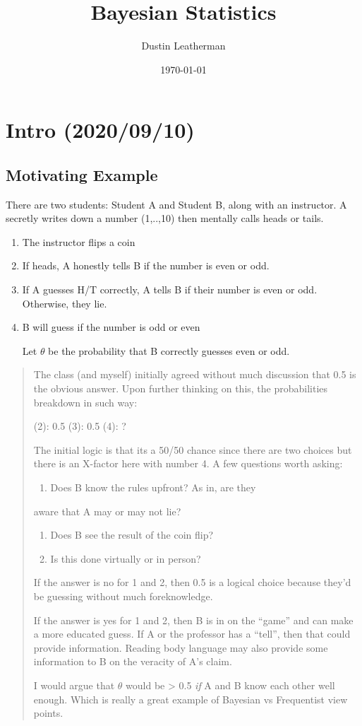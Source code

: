 \documentclass[11pt]{article}
\author{Dustin Leatherman}
\date{\today}
\title{Bayesian Statistics}
\begin{document}
\maketitle
\tableofcontents


\section{Intro (2020/09/10)}
\label{sec:orge420207}

\subsection{Motivating Example}
\label{sec:orga538e3f}
There are two students: Student A and Student B, along with an instructor.
A secretly writes down a number (1,..,10) then mentally calls heads or tails.

\begin{enumerate}
\item The instructor flips a coin
\item If heads, A honestly tells B if the number is even or odd.
\item If A guesses H/T correctly, A tells B if their number is even or odd.
Otherwise, they lie.
\item B will guess if the number is odd or even

Let \(\theta\) be the probability that B correctly guesses even or odd.
\end{enumerate}

\begin{quote}
The class (and myself) initially agreed without much discussion that 0.5 is the
obvious answer. Upon further thinking on this, the probabilities breakdown in
such way:

(2): 0.5
(3): 0.5
(4): ?

The initial logic is that its a 50/50 chance since there are two choices but
there is an X-factor here with number 4. A few questions worth asking:
\begin{enumerate}
\item Does B know the rules upfront? As in, are they
\end{enumerate}
aware that A may or may not lie?
\begin{enumerate}
\item Does B see the result of the coin flip?
\item Is this done virtually or in person?
\end{enumerate}

If the answer is no for 1 and 2, then 0.5 is a logical choice because they'd
be guessing without much foreknowledge.

If the answer is yes for 1 and 2, then B is in on the ``game'' and can make a more
educated guess. If A or the professor has a ``tell'', then that could provide
information. Reading body language may also provide some information to B on the
veracity of A's claim.

I would argue that \(\theta\) would be > 0.5 \emph{if} A and B know each other well
enough. Which is really a great example of Bayesian vs Frequentist view points.
\end{quote}
\end{document}
